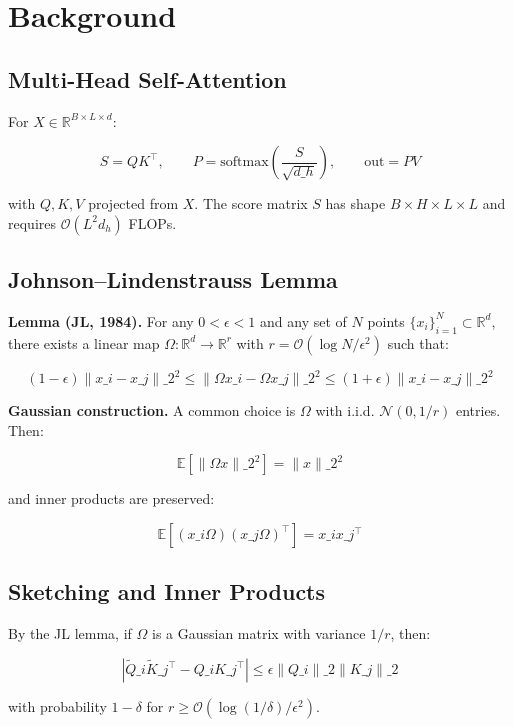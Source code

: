 
\section{Background}

\subsection{Multi-Head Self-Attention}

For $X \in \mathbb{R}^{B \times L \times d}$:

\[
S = Q K^\top, \qquad
P = \text{softmax}\!\left(\frac{S}{\sqrt{d\_h}}\right), \qquad
\text{out} = P V
\tag{3.1}
\]

with $Q, K, V$ projected from $X$. The score matrix $S$ has shape 
$B \times H \times L \times L$ and requires $\mathcal{O}(L^2 d_h)$ FLOPs.

\subsection{Johnson--Lindenstrauss Lemma}

\textbf{Lemma (JL, 1984).} For any $0 < \epsilon < 1$ and any set of $N$ points 
$\{x_i\}_{i=1}^N \subset \mathbb{R}^d$, there exists a linear map 
$\Omega : \mathbb{R}^d \to \mathbb{R}^r$ with 
$r = \mathcal{O}(\log N / \epsilon^2)$ such that:

\[
(1 - \epsilon) \|x\_i - x\_j\|\_2^2 \leq \|\Omega x\_i - \Omega x\_j\|\_2^2 \leq (1 + \epsilon) \|x\_i - x\_j\|\_2^2
\tag{3.2}
\]

\textbf{Gaussian construction.} A common choice is $\Omega$ with i.i.d. 
$\mathcal{N}(0, 1/r)$ entries. Then:

\[
\mathbb{E}[\|\Omega x\|\_2^2] = \|x\|\_2^2
\tag{3.3}
\]

and inner products are preserved:

\[
\mathbb{E}[(x\_i \Omega)(x\_j \Omega)^\top] = x\_i x\_j^\top
\tag{3.4}
\]

\subsection{Sketching and Inner Products}

By the JL lemma, if $\Omega$ is a Gaussian matrix with variance $1/r$, then:

\[
|\tilde{Q}\_i \tilde{K}\_j^\top - Q\_i K\_j^\top| \leq \epsilon \|Q\_i\|\_2 \|K\_j\|\_2
\tag{3.5}
\]

with probability $1 - \delta$ for $r \geq \mathcal{O}(\log(1/\delta) / \epsilon^2)$.

